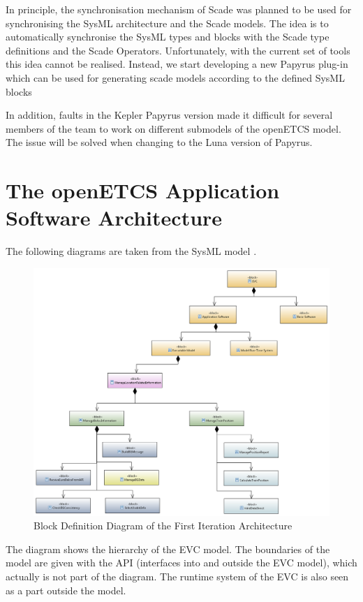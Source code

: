 \documentclass{template/openetcs_report}
\begin{document}
In principle, the synchronisation mechanism of Scade was planned to be used for synchronising the SysML architecture and the Scade models. The idea is to automatically synchronise the SysML types and blocks with the Scade type definitions and the Scade Operators. Unfortunately, with the current set of tools this idea cannot be realised. Instead, we start developing a new Papyrus plug-in which can be used for generating scade models according to the defined SysML blocks

In addition, faults in the Kepler Papyrus version made it difficult for several members of the team to work on different submodels of the openETCS model. The issue will be solved when changing to the Luna version of Papyrus.

\section{The openETCS Application Software Architecture}


The following diagrams are taken from the SysML model \cite{sysml-model}.

\begin{figure}[h]
\centering
\includegraphics[scale=0.4]{../images/FunctionalArchitectureHigh.png}
\caption{Block Definition Diagram of the First Iteration Architecture}
\end{figure}

The diagram shows the hierarchy of the EVC model. The boundaries of the model are given with the API (interfaces into and outside the EVC model), which actually is not part of the diagram. The runtime system of the EVC is also seen as a part outside the model.
\end{document}
